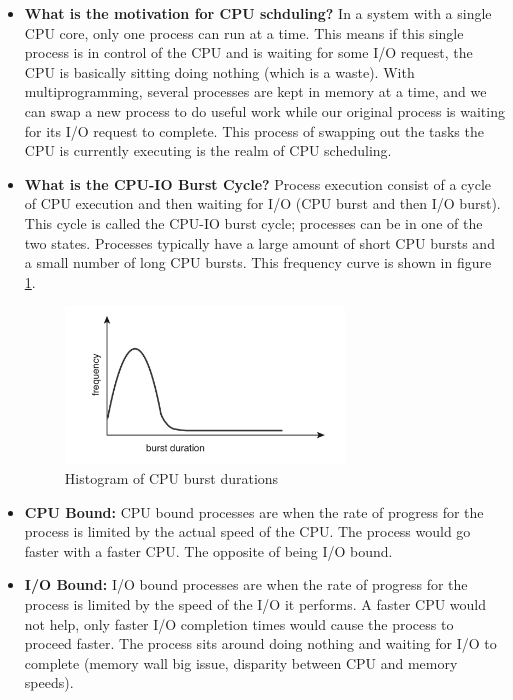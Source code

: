 \documentclass[12pt]{article}
\begin{document}
\begin{itemize}
    \item \textbf{What is the motivation for CPU schduling?} In a system with a single CPU core, only one process can run at a time. This means if this single process is in control of the CPU and is waiting for some I/O request, the CPU is basically sitting doing nothing (which is a waste). With multiprogramming, several processes are kept in memory at a time, and we can swap a new process to do useful work while our original process is waiting for its I/O request to complete. This process of swapping out the tasks the CPU is currently executing is the realm of CPU scheduling.
    \item \textbf{What is the CPU-IO Burst Cycle?} Process execution consist of a cycle of CPU execution and then waiting for I/O (CPU burst and then I/O burst). This cycle is called the CPU-IO burst cycle; processes can be in one of the two states. Processes typically have a large amount of short CPU bursts and a small number of long CPU bursts. This frequency curve is shown in figure \ref{fig:cpu-io-burst}.
        \begin{figure}[ht]
            \centering
            \includegraphics[width=0.7\textwidth]{figures/cpu-io-burst.jpg}
            \caption{Histogram of CPU burst durations}
            \label{fig:cpu-io-burst}
        \end{figure}
    \item \textbf{CPU Bound:} CPU bound processes are when the rate of progress for the process is limited by the actual speed of the CPU. The process would go faster with a faster CPU. The opposite of being I/O bound.
    \item \textbf{I/O Bound:}  I/O bound processes are when the rate of progress for the process is limited by the speed of the I/O it performs. A faster CPU would not help, only faster I/O completion times would cause the process to proceed faster. The process sits around doing nothing and waiting for I/O to complete (memory wall big issue, disparity between CPU and memory speeds).

\end{itemize}
\end{document}
